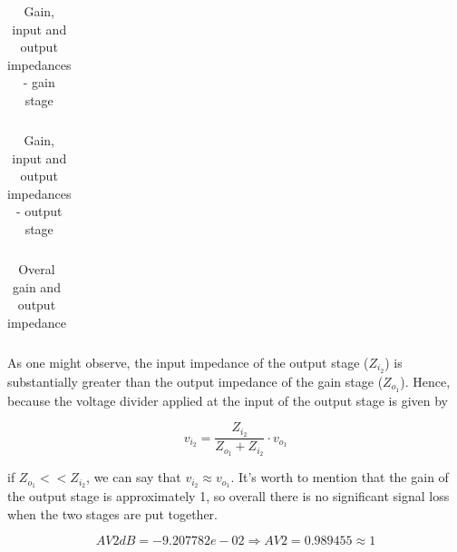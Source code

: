 \vspace{5mm}
\begin{table}[H]
	\centering
	\begin{tabularx}{0.9\textwidth} {
 	    | >{\raggedright\arraybackslash}X
  	    | >{\raggedleft\arraybackslash}X | }
	\hline
	
	\end{tabularx}
	\caption{Gain, input and output impedances - gain stage}
	\label{tab:stage1}
\end{table}
\vspace{5mm}

\begin{table}[H]
	\centering
	\begin{tabularx}{0.9\textwidth} {
 	    | >{\raggedright\arraybackslash}X
  	    | >{\raggedleft\arraybackslash}X | }
	\hline
	
	\end{tabularx}
	\caption{Gain, input and output impedances - output stage}
	\label{tab:stage2}
\end{table}
\vspace{5mm}

\begin{table}[H]
	\centering
	\begin{tabularx}{0.9\textwidth} {
 	    | >{\raggedright\arraybackslash}X
  	    | >{\raggedleft\arraybackslash}X | }
	\hline
	
	\end{tabularx}
	\caption{Overal gain and output impedance}
	\label{tab:overall}
\end{table}
\vspace{5mm}

\par As one might observe, the input impedance of the output stage ($Z_{i_2}$) is substantially greater than the output impedance of the gain stage ($Z_{o_1}$). Hence, because the voltage divider applied at the input of the output stage is given by

\begin{equation}
	v_{i_2}= \frac{Z_{i_2}}{Z_{o_1}+Z_{i_2}} \cdot v_{o_1}
\end{equation}

\noindent if $Z_{o_1}<<Z_{i_2}$, we can say that $v_{i_2} \approx v_{o_1}$. It's worth to mention that the gain of the output stage is approximately 1, so overall there is no significant signal loss when the two stages are put together.

\begin{equation}
	AV2dB = -9.207782e-02 \Rightarrow AV2 = 0.989455 \approx 1
\end{equation}


